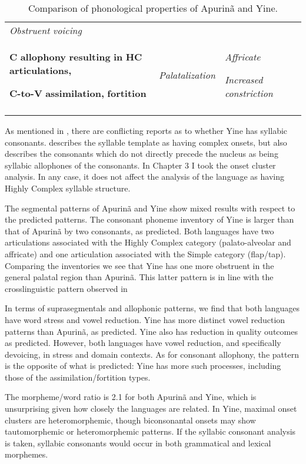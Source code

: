 \begin{table}
\begin{tabularx}{\textwidth}{XXX}
 \textit{Obstruent} \textit{voicing}\\
{ \textbf{C} \textbf{allophony} \textbf{resulting} \textbf{in} \textbf{HC} \textbf{articulations,} }

 \textbf{C-to-V} \textbf{assimilation,} \textbf{fortition} & \textit{Palatalization} & { \textit{Affricate}}

 \textit{Increased} \textit{constriction}\\
\lspbottomrule
\end{tabularx}
\caption{\label{8.3}Comparison of phonological properties of Apurinã and Yine.}
\end{table}




  As mentioned in , there are conflicting reports as to whether Yine has syllabic consonants. \citet{Matteson1965} describes the syllable template as having complex onsets, but also describes the consonants which do not directly precede the nucleus as being syllabic allophones of the consonants. In Chapter 3 I took the onset cluster analysis. In any case, it does not affect the analysis of the language as having Highly Complex syllable structure.



  The segmental patterns of Apurinã and Yine show mixed results with respect to the predicted patterns. The consonant phoneme inventory of Yine is larger than that of Apurinã by two consonants, as predicted. Both languages have two articulations associated with the Highly Complex category (palato-alveolar and affricate) and one articulation associated with the Simple category (flap/tap). Comparing the inventories we see that Yine has one more obstruent in the general palatal region than Apurinã. This latter pattern is in line with the crosslinguistic pattern observed in 



  In terms of suprasegmentals and allophonic patterns, we find that both languages have word stress and vowel reduction. Yine has more distinct vowel reduction patterns than Apurinã, as predicted. Yine also has reduction in quality outcomes as predicted. However, both languages have vowel reduction, and specifically devoicing, in stress and domain contexts. As for consonant allophony, the pattern is the opposite of what is predicted: Yine has more such processes, including those of the assimilation/fortition types.



  The morpheme/word ratio is 2.1 for both Apurinã and Yine, which is unsurprising given how closely the languages are related. In Yine, maximal onset clusters are heteromorphemic, though biconsonantal onsets may show tautomorphemic or heteromorphemic patterns. If the syllabic consonant analysis is taken, syllabic consonants would occur in both grammatical and lexical morphemes.



